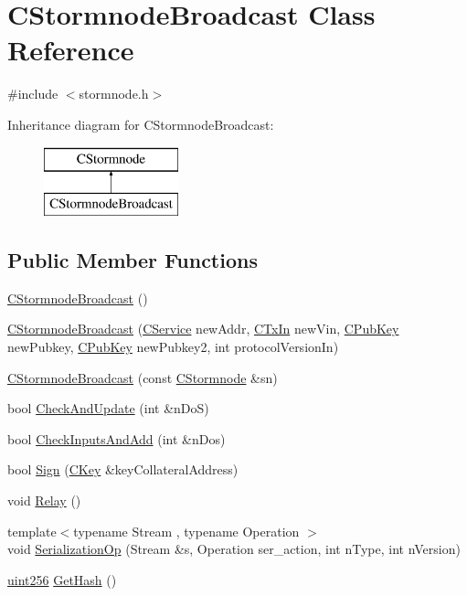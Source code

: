 \hypertarget{class_c_stormnode_broadcast}{}\section{C\+Stormnode\+Broadcast Class Reference}
\label{class_c_stormnode_broadcast}


{\ttfamily \#include $<$stormnode.\+h$>$}

Inheritance diagram for C\+Stormnode\+Broadcast\+:\begin{figure}[H]
\begin{center}
\leavevmode
\includegraphics[height=2.000000cm]{class_c_stormnode_broadcast}
\end{center}
\end{figure}
\subsection*{Public Member Functions}
\begin{DoxyCompactItemize}
\item 
\hyperlink{class_c_stormnode_broadcast_a47810d94d4efad26911a2a3c0745660f}{C\+Stormnode\+Broadcast} ()
\item 
\hyperlink{class_c_stormnode_broadcast_a75374331e61dee9175968332d9cedc5c}{C\+Stormnode\+Broadcast} (\hyperlink{class_c_service}{C\+Service} new\+Addr, \hyperlink{class_c_tx_in}{C\+Tx\+In} new\+Vin, \hyperlink{class_c_pub_key}{C\+Pub\+Key} new\+Pubkey, \hyperlink{class_c_pub_key}{C\+Pub\+Key} new\+Pubkey2, int protocol\+Version\+In)
\item 
\hyperlink{class_c_stormnode_broadcast_a5f7014f4d8bd8b5a966921b55f50ef90}{C\+Stormnode\+Broadcast} (const \hyperlink{class_c_stormnode}{C\+Stormnode} \&sn)
\item 
bool \hyperlink{class_c_stormnode_broadcast_a1492e5bc8fc2587de913ec8ffc9d18a8}{Check\+And\+Update} (int \&n\+Do\+S)
\item 
bool \hyperlink{class_c_stormnode_broadcast_ac182349ba784e20ce826eda23a239e3c}{Check\+Inputs\+And\+Add} (int \&n\+Dos)
\item 
bool \hyperlink{class_c_stormnode_broadcast_a882ba76a946d67b53211c561b52fcb0b}{Sign} (\hyperlink{class_c_key}{C\+Key} \&key\+Collateral\+Address)
\item 
void \hyperlink{class_c_stormnode_broadcast_a6022d4cda8f1676aef30a3eaa2c512e5}{Relay} ()
\item 
{\footnotesize template$<$typename Stream , typename Operation $>$ }\\void \hyperlink{class_c_stormnode_broadcast_a5a56ebaf1e2e97ee84186e55440202b7}{Serialization\+Op} (Stream \&s, Operation ser\+\_\+action, int n\+Type, int n\+Version)
\item 
\hyperlink{classuint256}{uint256} \hyperlink{class_c_stormnode_broadcast_aec7747051b1004f1532817aba1da1a4c}{Get\+Hash} ()
\end{DoxyCompactItemize}
